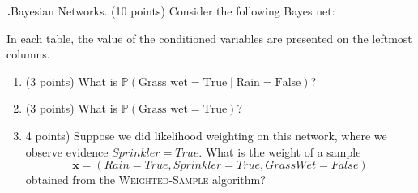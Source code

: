 \documentclass[12pt]{amsart}
\newenvironment{statement}[1]{\smallskip\noindent\color[rgb]{0.0,0.0,0.0} {\bf #1.}}{}
\newcommand{\1}{\mathds{1}}
\begin{document}
\newpage

\begin{statement}{3}
\emph{Bayesian Networks.} (10 points) Consider the following Bayes net:

\newcommand{\vara}{Sprinkler}
\newcommand{\varb}{Grass wet}
\newcommand{\varc}{Rain}
\begin{center}
\end{center}
    In each table, the value of the conditioned variables are presented on the leftmost columns.
    \begin{enumerate}
        \item (3 points) What is $\mathbb{P}(\text{Grass wet}=\text{True}\mid \text{Rain}=\text{False})$?
        \item (3 points) What is $\mathbb{P}(\text{Grass wet}=\text{True})$?
        \item 4 points) Suppose we did likelihood weighting on this network, where we observe evidence $Sprinkler=True$.
        What is the weight of a sample \[\bm x = (Rain=True, Sprinkler=True, GrassWet=False)\] obtained from the \textsc{Weighted-Sample} algorithm?
    \end{enumerate}

\end{statement}
\end{document}
